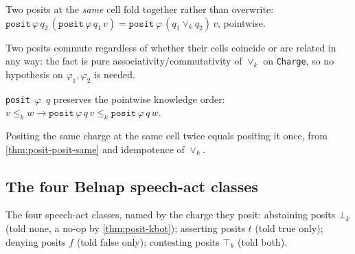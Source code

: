 \begin{theorem}\label{thm:posit-posit-same}\leanok{}
Two posits at the \emph{same} cell fold together rather than overwrite:
\(\texttt{posit}\,\varphi\,q_2\,(\texttt{posit}\,\varphi\,q_1\,v) =
\texttt{posit}\,\varphi\,(q_1 \vee_k q_2)\,v\), pointwise.
\end{theorem}

\begin{theorem}\label{thm:posit-comm}\leanok{}
Two posits commute regardless of whether their cells coincide or are
related in any way: the fact is pure associativity/commutativity of
\(\vee_k\) on \texttt{Charge}, so no hypothesis on \(\varphi_1, \varphi_2\)
is needed.
\end{theorem}

\begin{theorem}\label{thm:posit-monotone}\leanok{}
\texttt{posit}~\(\varphi\)~\(q\) preserves the pointwise knowledge order:
\(v \le_k w \to \texttt{posit}\,\varphi\,q\,v \le_k \texttt{posit}\,\varphi\,q\,w\).
\end{theorem}

\begin{theorem}\label{thm:posit-idem}\leanok{}
Positing the same charge at the same cell twice equals positing it once,
from \cref{thm:posit-posit-same} and idempotence of \(\vee_k\).
\end{theorem}

\subsection*{The four Belnap speech-act classes}

\begin{definition}\label{thm:belnap-classes}\leanok{}
The four speech-act classes, named by the charge they posit: abstaining
posits \(\bot_k\) (told none, a no-op by \cref{thm:posit-kbot}); asserting
posits \(t\) (told true only); denying posits \(f\) (told false only);
contesting posits \(\top_k\) (told both).
\end{definition}


